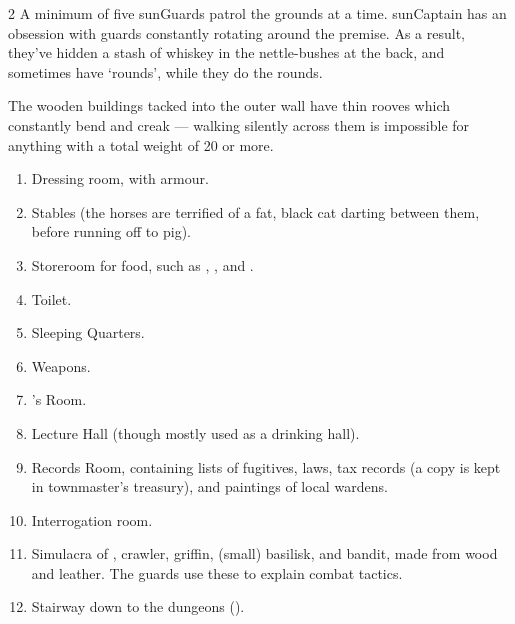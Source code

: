 \begin{multicols}{2}
A minimum of five \glspl{sunGuard} patrol the grounds at a time.
\Gls{sunCaptain} has an obsession with guards constantly rotating around the premise.
As a result, they've hidden a stash of whiskey in the nettle-bushes at the back, and sometimes have `rounds', while they do the rounds.


The wooden buildings tacked into the outer wall have thin rooves which constantly bend and creak --- walking silently across them is impossible for anything with a total \gls{weight} of 20 or more.


\begin{enumerate}
  \item
  Dressing room, with armour.
  \label{stationDressing}%
  \item
  Stables\label{stationStables} (the horses are terrified of a fat, black cat darting between them, before running off to \gls{pig}).
  \item
  Storeroom for food, such as \rations, \rations, and \rations.
  \label{stationStorage}
  \item
  Toilet.
  \label{stationToilet}
  \item
  Sleeping Quarters.
  \label{stationSleep}
  \item
  Weapons.
  \label{stationWeapons}
  \item
  's Room.
  \label{stationCaptainRoom}
  \item
  Lecture Hall (though mostly used as a drinking hall).
  \label{stationLecture}
  \item
  Records Room, containing lists of fugitives, laws, tax records (a copy is kept in \gls{townmaster}'s treasury), and paintings of local \glspl{warden}.
  \label{stationRecords}
  \item
  Interrogation room.
  \label{stationInterrogation}
  \item
  Simulacra of , \gls{crawler}, \gls{griffin}, (small) \gls{basilisk}, and bandit, made from wood and leather.
  The guards use these to explain combat tactics.
  \label{stationShrine}
  \item
  Stairway down to the dungeons ().
  \label{stationStairs}
\end{enumerate}

\end{multicols}

